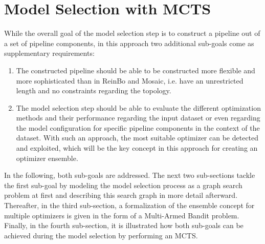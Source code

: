 \section{Model Selection with MCTS}
\label{sec:approach:selection}
While the overall goal of the model selection step is to construct a pipeline out of a set of pipeline components, in this approach two additional sub-goals come as supplementary requirements:
\begin{enumerate}
    \item The constructed pipeline should be able to be constructed more flexible and more sophisticated than in ReinBo and Mosaic, i.e. have an unrestricted length and no constraints regarding the topology.
    \item The model selection step should be able to evaluate the different optimization methods and their performance regarding the input dataset or even regarding the model configuration for specific pipeline components in the context of the dataset.
    With such an approach, the most suitable optimizer can be detected and exploited, which will be the key concept in this approach for creating an optimizer ensemble.
\end{enumerate}
In the following, both sub-goals are addressed.
The next two sub-sections tackle the first sub-goal by modeling the model selection process as a graph search problem at first and describing this search graph in more detail afterward.
Thereafter, in the third sub-section, a formalization of the ensemble concept for multiple optimizers is given in the form of a Multi-Armed Bandit problem.
Finally, in the fourth sub-section, it is illustrated how both sub-goals can be achieved during the model selection by performing an MCTS.

